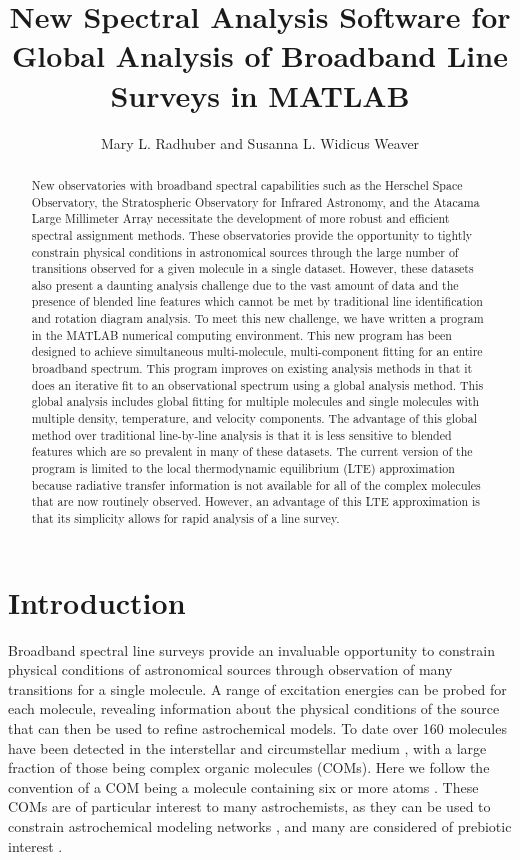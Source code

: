 \documentclass[11pt,twoside]{article}
\begin{document}
\title{New Spectral Analysis Software for Global Analysis of Broadband Line Surveys in MATLAB}
\author{Mary L. Radhuber and Susanna L. Widicus Weaver
}

\begin{abstract}
New observatories with broadband spectral capabilities such as the Herschel Space Observatory, the Stratospheric Observatory for Infrared Astronomy, and the Atacama Large Millimeter Array necessitate the development of more robust and efficient spectral assignment methods.  These observatories provide the opportunity to tightly constrain physical conditions in astronomical sources through the large number of transitions observed for a given molecule in a single dataset.  However, these datasets also present a daunting analysis challenge due to the vast amount of data and the presence of blended line features which cannot be met by traditional line identification and rotation diagram analysis.  To meet this new challenge, we have written a program in the MATLAB numerical computing environment.  This new program has been designed to achieve simultaneous multi-molecule, multi-component fitting for an entire broadband spectrum.  This program improves on existing analysis methods in that it does an iterative fit to an observational spectrum using a global analysis method.  This global analysis includes global fitting for multiple molecules and single molecules with multiple density, temperature, and velocity components.  The advantage of this global method over traditional line-by-line analysis is that it is less sensitive to blended features which are so prevalent in many of these datasets.  The current version of the program is limited to the local thermodynamic equilibrium (LTE) approximation because radiative transfer information is not available for all of the complex molecules that are now routinely observed.  However, an advantage of this LTE approximation is that its simplicity allows for rapid analysis of a line survey.
\end{abstract}

\section{Introduction}
Broadband spectral line surveys provide an invaluable opportunity to constrain physical conditions of astronomical sources through observation of many transitions for a single molecule.  A range of excitation energies can be probed for each molecule, revealing information about the physical conditions of the source that can then be used to refine astrochemical models.  To date over 160 molecules have been detected in the interstellar and circumstellar medium \citep{Muller_2005}, with a large fraction of those being complex organic molecules (COMs). Here we follow the convention of a COM being a molecule containing six or more atoms \citep{Herbst_2009}. These COMs are of particular interest to many astrochemists, as they can be used to constrain astrochemical modeling networks \citep{Garrod_2008, Laas_2011}, and many are considered of prebiotic interest \citep{Carroll_2010}.
\end{document}
